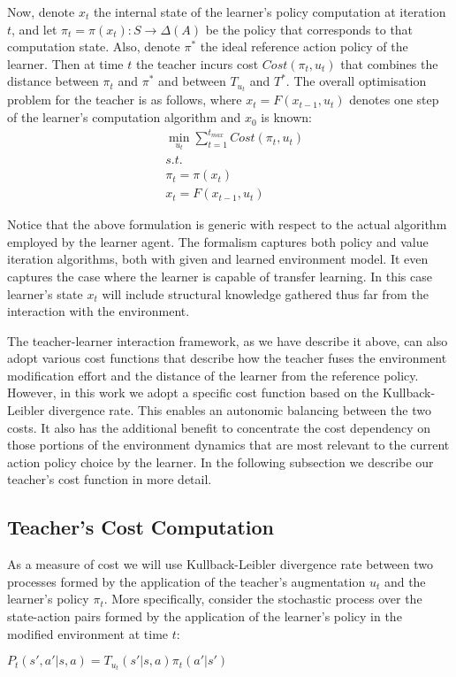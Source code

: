 \documentclass[letterpaper]{aamas2009}
\begin{document}
Now, denote $x_t$ the internal state of the learner's policy
computation at iteration $t$, and let
$\pi_t=\pi(x_t):S\rightarrow\Delta(A)$ be the policy that corresponds
to that computation state. Also, denote $\pi^*$ the ideal reference
action policy of the learner. Then at time $t$ the teacher incurs cost
$Cost(\pi_t,u_t)$ that combines the distance between $\pi_t$ and
$\pi^*$ and between $T_{u_t}$ and $T^*$. The overall optimisation
problem for the teacher is as follows, where $x_t=F(x_{t-1},u_t)$
denotes one step of the learner's computation algorithm and $x_0$ is
known:
\begin{eqnarray*}
&\min\limits_{u_t}\sum\limits_{t=1}^{t_{max}}Cost(\pi_t,u_t)\\
&s.t.\\
&\pi_t=\pi(x_t)\\
&x_t=F(x_{t-1},u_t)
\end{eqnarray*}

Notice that the above formulation is generic with respect to the
actual algorithm employed by the learner agent. The formalism captures
both policy and value iteration algorithms, both with given and
learned environment model. It even captures the case where the learner
is capable of transfer learning. In this case learner's state $x_t$
will include structural knowledge gathered thus far from the
interaction with the environment. 

The teacher-learner interaction framework, as we have describe it
above, can also adopt various cost functions that describe how the
teacher fuses the environment modification effort and the distance of
the learner from the reference policy. However, in this work we adopt
a specific cost function based on the Kullback-Leibler divergence
rate. This enables an autonomic balancing between the two costs. It also
has the additional benefit to concentrate the cost dependency on those
portions of the environment dynamics that are most relevant to the
current action policy choice by the learner. In the following
subsection we describe our teacher's cost function in more detail.

\subsection{Teacher's Cost Computation}
As a measure of cost we will use Kullback-Leibler divergence rate
between two processes formed by the application of the teacher's
augmentation $u_t$ and the learner's policy $\pi_t$. More specifically,
consider the stochastic process over the state-action pairs formed by
the application of the learner's policy in the modified environment at
time $t$: \\
\centerline{$
P_t(s',a'|s,a)=T_{u_t}(s'|s,a)\pi_t(a'|s')
$}
\end{document}
